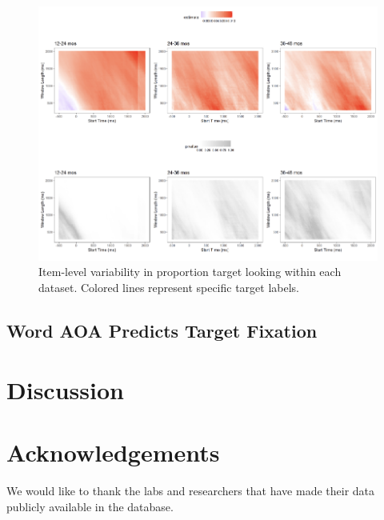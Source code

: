 \documentclass[10pt, letterpaper]{article}
\newenvironment{CodeChunk}{}{}
\begin{document}
\begin{CodeChunk}
\begin{figure}[h]

{\centering \includegraphics{figs/time_window-1} 

}

\caption[Item-level variability in proportion target looking within each dataset]{Item-level variability in proportion target looking within each dataset. Colored lines represent specific target labels.}\label{fig:time_window}
\end{figure}
\end{CodeChunk}

\hypertarget{word-aoa-predicts-target-fixation}{%
\subsection{Word AOA Predicts Target
Fixation}\label{word-aoa-predicts-target-fixation}}

\hypertarget{discussion}{%
\section{Discussion}\label{discussion}}

\hypertarget{acknowledgements}{%
\section{Acknowledgements}\label{acknowledgements}}

We would like to thank the labs and researchers that have made their
data publicly available in the database.
\end{document}
